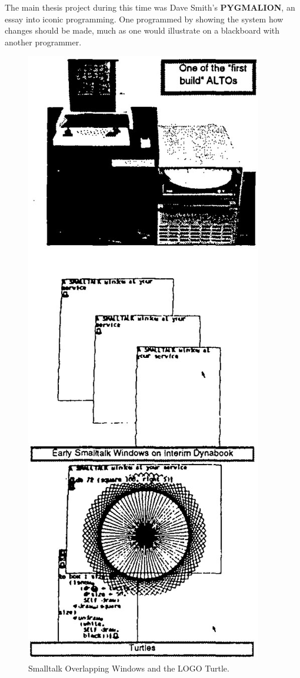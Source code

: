 \documentclass[letterpaper,12pt,parskip=full]{article}
\begin{document}
The main thesis project during this time was Dave Smith's \textbf{PYGMALION}, an essay into iconic programming. One programmed by showing the system how changes should be made, much as one would illustrate on a blackboard with another programmer. 

 \begin{figure}[ht]
        \centering \includegraphics[scale=0.55]{WINDOWS_AND_TURTLES.jpg}
        \caption{
                \label{fig:windows_and_turles}
                Smalltalk Overlapping Windows and the LOGO Turtle.
        }
\end{figure}
\end{document}
